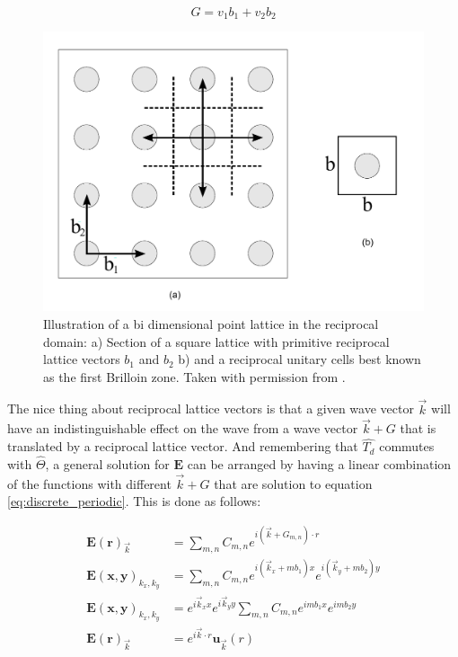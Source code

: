 $$G = v_1b_1+v_2b_2$$

\begin{figure}
\centering
\includegraphics[scale=.5]{./img/squarer.pdf}
\caption{Illustration of a bi dimensional point lattice in the reciprocal domain: a) Section of a square lattice with primitive reciprocal lattice vectors $b_1$ and $b_2$ b)  and a reciprocal unitary cells best known as the first Brilloin zone. Taken with permission from \cite{Guarin2012}.}
\end{figure}

The nice thing about reciprocal lattice vectors is that a given wave vector $\vec{k}$ will have an indistinguishable effect on the wave from a wave vector $\vec{k} + G$ that is translated by a reciprocal lattice vector.  And remembering that $\hat{T_d}$ commutes with $\hat{\Theta}$, a general solution for $\mathbf{E}$ can be arranged by having a linear combination of the functions with different $\vec{k} + G$ that are solution to equation \ref{eq:discrete_periodic}. This is done as follows:

\begin{align*}
\mathbf{E(r)}_{\vec{k}} &= \sum_{m,n}C_{m,n}e^{i(\vec{k}+G_{m,n})\cdot r}\\
\mathbf{E(x,y)}_{k_x,k_y} &= \sum_{m,n}C_{m,n}e^{i(\vec{k}_x + mb_1)x}e^{i(\vec{k}_y + mb_2)y}\\
\mathbf{E(x,y)}_{k_x,k_y} &= e^{i\vec{k}_x x}e^{i\vec{k}_y y}\sum_{m,n}C_{m,n}e^{imb_1x}e^{imb_2y}\\
\mathbf{E(r)}_{\vec{k}} &= e^{i\vec{k}\cdot r} \mathbf{u}_{\vec{k}}(r)
\end{align*}

